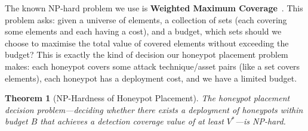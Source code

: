 \documentclass[journal]{IEEEtran}
\newtheorem{theorem}{Theorem}
\begin{document}
The known NP-hard problem we use is \textbf{Weighted Maximum
Coverage}~\cite{feige1998}.
This problem asks: given a universe of elements, a collection
of sets (each covering some elements and each having a cost),
and a budget, which sets should we choose to maximise the
total value of covered elements without exceeding the
budget?
This is exactly the kind of decision our honeypot placement
problem makes: each honeypot covers some attack
technique/asset pairs (like a set covers elements), each
honeypot has a deployment cost, and we have a limited budget.

\begin{theorem}[NP-Hardness of Honeypot Placement]
\label{thm:nphard}
The honeypot placement decision problem---deciding whether
there exists a deployment of honeypots within budget $B$
that achieves a detection coverage value of at least
$V^*$---is NP-hard.
\end{theorem}
\end{document}
